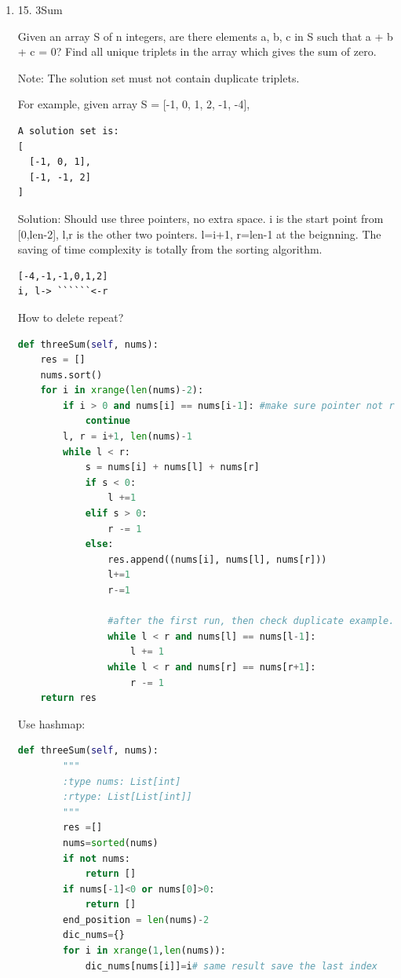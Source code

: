 \documentclass[../specific-algorithms.tex]{subfiles}
\begin{document}
\begin{enumerate}
    \item 15. 3Sum

Given an array S of n integers, are there elements a, b, c in S such that a + b + c = 0? Find all unique triplets in the array which gives the sum of zero.

Note: The solution set must not contain duplicate triplets.

For example, given array S = [-1, 0, 1, 2, -1, -4],
\begin{lstlisting}
A solution set is:
[
  [-1, 0, 1],
  [-1, -1, 2]
]
\end{lstlisting}

Solution: Should use three pointers, no extra space. i is the start point from [0,len-2], l,r is the other two pointers. l=i+1, r=len-1 at the beignning. The saving of time complexity is totally from the sorting algorithm.
\begin{lstlisting}
[-4,-1,-1,0,1,2]
i, l-> ``````<-r
\end{lstlisting}
How to delete repeat?
\begin{lstlisting}[language = Python]
def threeSum(self, nums):
    res = []
    nums.sort()
    for i in xrange(len(nums)-2):
        if i > 0 and nums[i] == nums[i-1]: #make sure pointer not repeat
            continue
        l, r = i+1, len(nums)-1
        while l < r:
            s = nums[i] + nums[l] + nums[r]
            if s < 0:
                l +=1 
            elif s > 0:
                r -= 1
            else:
                res.append((nums[i], nums[l], nums[r]))
                l+=1
                r-=1

                #after the first run, then check duplicate example.
                while l < r and nums[l] == nums[l-1]:
                    l += 1
                while l < r and nums[r] == nums[r+1]:
                    r -= 1
    return res
\end{lstlisting}
Use hashmap:
\begin{lstlisting}[language = Python]
def threeSum(self, nums):
        """
        :type nums: List[int]
        :rtype: List[List[int]]
        """
        res =[]
        nums=sorted(nums)
        if not nums:
            return []
        if nums[-1]<0 or nums[0]>0:
            return []
        end_position = len(nums)-2
        dic_nums={}
        for i in xrange(1,len(nums)):
            dic_nums[nums[i]]=i# same result save the last index
        

\end{lstlisting}
\end{enumerate}
\end{document}
